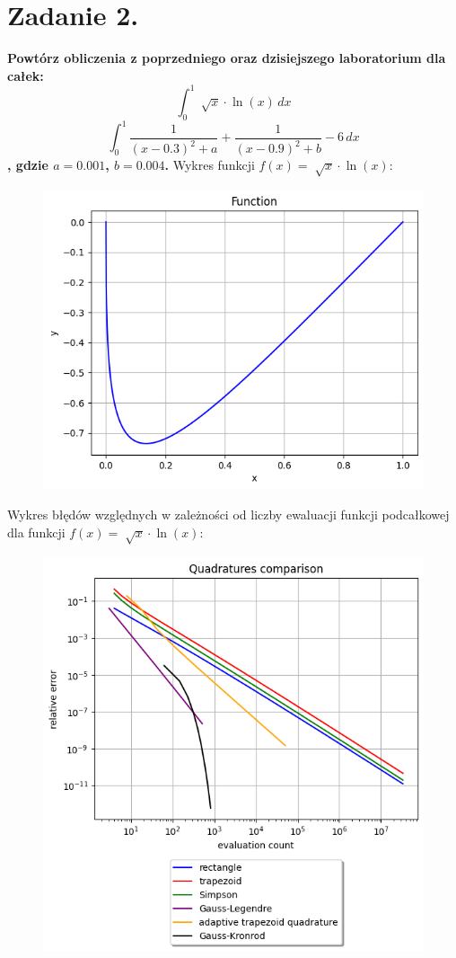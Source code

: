 \documentclass{article}
\begin{document}
\section*{Zadanie 2.}
\textbf{Powtórz obliczenia z poprzedniego oraz dzisiejszego laboratorium
dla całek:
$$ \int_{0}^{1} \sqrt[]{x}\cdot \ln(x) \,dx $$
$$ \int_{0}^{1} \frac{1}{(x-0.3)^2 + a} + \frac{1}{(x-0.9)^2 + b} - 6\,dx $$
, gdzie $a=0.001$, $b=0.004$.}
\newpage
Wykres funkcji $f(x) = \sqrt[]{x}\cdot \ln(x)$:
\begin{figure}[H]
  \includegraphics[width=\linewidth]{figures/g.png}
\end{figure}
Wykres błędów względnych w zależności od liczby ewaluacji
funkcji podcałkowej dla funkcji $f(x) = \sqrt[]{x}\cdot \ln(x)$:
\begin{figure}[H]
  \includegraphics[width=\linewidth]{figures/quad_g.png}
\end{figure}
\end{document}
